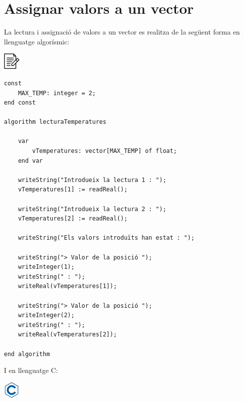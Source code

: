 \documentclass[]{book}
\begin{document}
\section{Assignar valors a un vector}\label{assignar-valors-a-un-vector}

La lectura i assignació de valors a un vector es realitza de la següent
forma en llenguatge algorísmic:

\includegraphics{./img/alg.png}

\begin{verbatim}
const
    MAX_TEMP: integer = 2;
end const

algorithm lecturaTemperatures

    var
        vTemperatures: vector[MAX_TEMP] of float;
    end var

    writeString("Introdueix la lectura 1 : ");
    vTemperatures[1] := readReal();

    writeString("Introdueix la lectura 2 : ");
    vTemperatures[2] := readReal();
    
    writeString("Els valors introduïts han estat : ");
    
    writeString("> Valor de la posició ");
    writeInteger(1);
    writeString(" : ");
    writeReal(vTemperatures[1]);
    
    writeString("> Valor de la posició ");
    writeInteger(2);
    writeString(" : ");
    writeReal(vTemperatures[2]);

end algorithm
\end{verbatim}

I en llenguatge C:

\includegraphics{./img/c.png}
\end{document}
